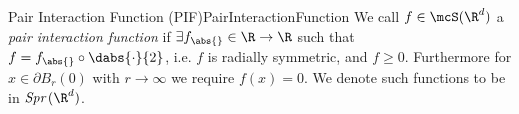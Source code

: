 \begin{mdef}{Pair Interaction Function (PIF)}{PairInteractionFunction}
    We call $f\in\mcS(\R^d)$ a \emph{pair interaction function} if $\exists f_{\abs{}}\in\R\to\R$ such that $f = f_{\abs{}}\circ\dabs{\cdot}{2}$, i.e. $f$ is radially symmetric, and $f \geq 0$. \color{black} Furthermore for $x\in \partial B_r(0)$ with $r\to\infty$ we require $f(x) = 0$. %
    We denote such functions to be in $\textit{Spr}\,(\R^d)$.
\end{mdef}
